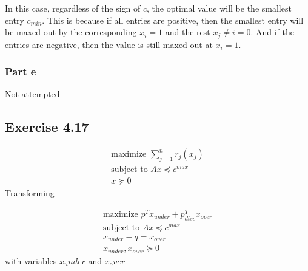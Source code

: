 In this case, regardless of the sign of $c$, the optimal value will be the smallest entry $c_{min}$. This is because if all entries are positive, then the smallest entry will be maxed out by the corresponding $x_i=1$ and the rest $x_j \neq i = 0$. And if the entries are negative, then the value is still maxed out at $x_i = 1$. \\
\subsubsection{Part e}
Not attempted

\subsection{Exercise 4.17}
\begin{equation}
  \begin{aligned}
    \text{maximize } \sum_{j=1}^{n} r_j(x_j) \\
    \text{subject to } A x \preceq c^{max} \\
    x \succeq 0
  \end{aligned}
\end{equation}
Transforming

\begin{equation}
  \begin{aligned}
    \text{maximize } p^T x_{under} + p_{disc}^T x_{over}\\
    \text{subject to } A x \preceq c^{max} \\
    x_{under} -q = x_{over} \\
    x_{under}, x_{over} \succeq 0 
  \end{aligned}
\end{equation}
with variables $x_under$ and $x_over$